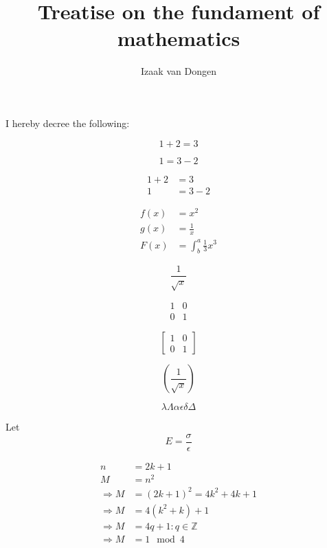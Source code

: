 \documentclass{article}
\title{Treatise on the fundament of mathematics}
\author{Izaak van Dongen}
\begin{document}
I hereby decree the following:

\begin{equation*}
  1 + 2 = 3 
\end{equation*}

\begin{equation*}
  1 = 3 - 2
\end{equation*}

\begin{align*}
  1 + 2 &= 3\\
  1 &= 3 - 2
\end{align*}

\begin{align*}
  f(x) &= x^2\\
  g(x) &= \frac{1}{x}\\
  F(x) &= \int^a_b \frac{1}{3}x^3
\end{align*}

\begin{equation*}
\frac{1}{\sqrt{x}}
\end{equation*}

\begin{equation*}
\begin{matrix}
1 & 0\\
0 & 1
\end{matrix}
\end{equation*}

\begin{equation*}
\left[
\begin{matrix}
1 & 0\\
0 & 1
\end{matrix}
\right]
\end{equation*}

\begin{equation*}
\left(\frac{1}{\sqrt{x}}\right)
\end{equation*}

\begin{equation*}
\lambda \Lambda
\alpha
\epsilon
\delta \Delta
\end{equation*}

Let \begin{equation*}
E = \frac{\sigma}{\epsilon}
\end{equation*}

\begin{align*}
    n &= 2k + 1\\
    M &= n^{2}\\
    \Rightarrow M &= (2k + 1)^{2} = 4k^{2} + 4k + 1\\
    \Rightarrow M &= 4(k^{2} + k) + 1\\
    \Rightarrow M &= 4q + 1 : q \in \mathbb{Z}\\
    \Rightarrow M &= 1 \mod 4\\
\end{align*}
\end{document}

